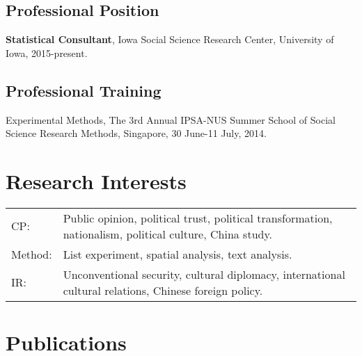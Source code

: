\documentclass[letterpaper]{article}
\renewenvironment{itemize}{
  \begin{list}{}{
    \setlength{\leftmargin}{1.5em}
  }
}{
  \end{list}
}
\begin{document}
\subsection*{Professional Position}
\begin{itemize}
	\item \textbf{Statistical Consultant}, Iowa Social Science Research Center, University of Iowa, 2015-present.
\end{itemize}


\subsection*{Professional Training}
\begin{itemize}
  \item Experimental Methods, The 3rd Annual IPSA-NUS Summer School of Social Science Research Methods, Singapore, 30 June-11 July, 2014.
\end{itemize}



\section*{\textbf{Research Interests}}
\begin{tabular}{ll}
    CP:& Public opinion, political trust, political transformation, nationalism, political culture, China study. \\
    Method:& List experiment, spatial analysis, text analysis.\\
    IR:& Unconventional security, cultural diplomacy, international cultural relations, Chinese foreign policy.\\
\end{tabular}

\section*{\textbf{Publications}}
\end{document}
